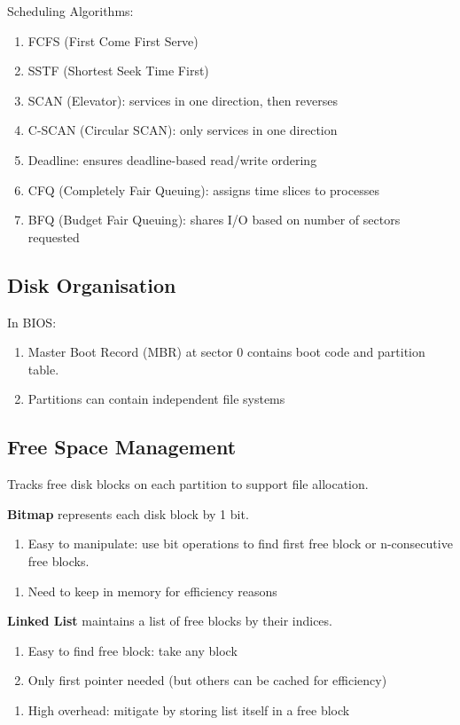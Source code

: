 \documentclass[12pt, a4paper]{article}
\begin{document}
\begin{multicols*}{3}
Scheduling Algorithms:
\begin{enumerate}[\roman*.]
  \item FCFS (First Come First Serve)
  \item SSTF (Shortest Seek Time First)
  \item SCAN (Elevator): services in one direction, then reverses
  \item C-SCAN (Circular SCAN): only services in one direction
  \item Deadline: ensures deadline-based read/write ordering
  \item CFQ (Completely Fair Queuing): assigns time slices to processes
  \item BFQ (Budget Fair Queuing): shares I/O based on number of sectors requested
\end{enumerate}

\colbreak
\subsection{Disk Organisation}

In BIOS:
\begin{enumerate}[\roman*.]
  \item Master Boot Record (MBR) at sector 0 contains boot code and partition table.
  \item Partitions can contain independent file systems
\end{enumerate}

{\centering{}\par}

\subsection{Free Space Management}
Tracks free disk blocks on each partition to support file allocation. 

\textbf{Bitmap} represents each disk block by 1 bit.
\begin{enumerate}[$+$]
  \item Easy to manipulate: use bit operations to find first free block or n-consecutive free blocks. 
\end{enumerate}\vspace{-1pt}
\begin{enumerate}[$-$]
  \item Need to keep in memory for efficiency reasons 
\end{enumerate}

\textbf{Linked List} maintains a list of free blocks by their indices.
\begin{enumerate}[$+$]
  \item Easy to find free block: take any block 
  \item Only first pointer needed (but others can be cached for efficiency)
\end{enumerate}\vspace{-1pt}
\begin{enumerate}[$-$]
  \item High overhead: mitigate by storing list itself in a free block
\end{enumerate}


\end{multicols*}
\end{document}
